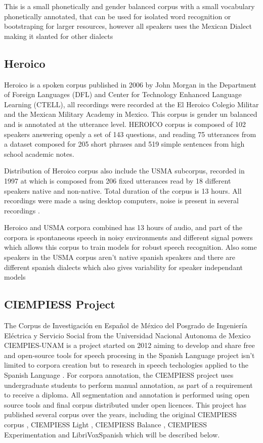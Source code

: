 \documentclass[10pt, a4paper]{article}
\begin{document}
This is a small phonetically and gender balanced corpus with a small vocabulary phonetically annotated, that can be used for isolated word recognition or bootstraping for larger resources, however all speakers uses the Mexican Dialect making it slanted for other dialects

\subsection{Heroico}

Heroico is a spoken corpus published in 2006 by John Morgan in the Department of Foreign Languages (DFL) and Center for Technology Enhanced Language Learning (CTELL), all recordings were recorded at the El Heroico Colegio Militar and the Mexican Military Academy in Mexico. This corpus is gender un balanced and is annotated at the utterance level. HEROICO corpus is composed of 102 speakers answering openly a set of 143 questions, and  reading 75 utterances from a dataset composed for 205 short phrases and 519 simple sentences from high school academic notes.

Distribution of Heroico corpus also include the USMA subcorpus, recorded in 1997 at which is composed from 206 fixed utterances read by 18 different speakers native and non-native. Total duration of the corpus is 13 hours. All recordings were made a using desktop computers, noise is present in several recordings \cite{heroico}.

Heroico and USMA corpora combined has 13 hours of audio, and part of the corpora is spontaneous speech in noisy environments and different signal powers which allows this corpus to train models for robust speech recognition. Also some speakers in the USMA corpus aren't native spanish speakers and there are different spanish dialects which also gives variability for speaker independant models
 

\subsection{CIEMPIESS Project}

 The Corpus de Investigación en Español de México del Posgrado de Ingeniería Eléctrica y Servicio Social from the Universidad Nacional Autonoma de Mexico CIEMPIES-UNAM is a project started on 2012 aiming to develop and share free and open-source tools for speech procesing in the Spanish Language   project isn't limited to corpora creation but to research in speech techologies applied to the Spanish Language \cite{CIEMPIESS-Webpage}. For corpora annotation, the CIEMPIESS project uses undergraduate students to perform manual annotation, as part of a requirement to receive a diploma. All segmentation and annotation is performed using open source tools and final corpus distributed under open licences. This project has published several corpus over the years, including the original CIEMPIESS corpus \cite{CIEMPIESS}, CIEMPIESS Light \cite{CIEMPIESS-LIGHT}, CIEMPIESS Balance \cite{CIEMPIESS-BALANCE}, CIEMPIESS Experimentation \cite{CIEMPIESS-Experimentation} and LibriVoxSpanish \cite{LibriVox-Spanish} which will be described below.
\end{document}
